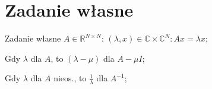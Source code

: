 \section{Zadanie własne}



\entry
Zadanie własne $A \in \mathbb{R}^{N \times N}$:
$(\lambda,x) \in \mathbb{C} \times \mathbb{C}^N: Ax = \lambda x$;

\entry
Gdy $\lambda$ dla $A$, to $(\lambda - \mu)$ dla $A-\mu I$;

\entry
Gdy $\lambda$ dla $A$ nieos., to $\frac{1}{\lambda}$ dla $A^{-1}$;








